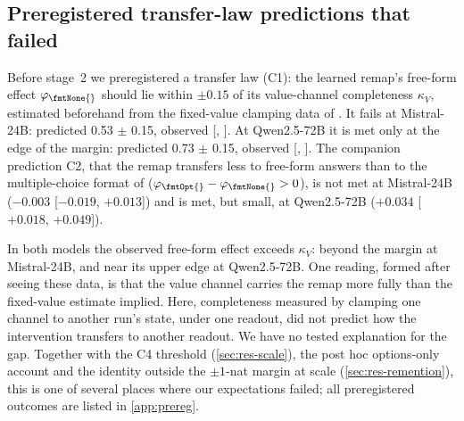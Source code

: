 \subsection{Preregistered transfer-law predictions that failed}\label{sec:res-failed}

Before stage~2 we preregistered a transfer law (C1): the learned remap's free-form effect $\varphi_{\fmtNone{}}$ should lie within $\pm 0.15$ of its value-channel completeness $\kappa_V$, estimated beforehand from the fixed-value clamping data of \citet{anonymous2026fitted}. It fails at Mistral-24B: predicted 0.53 $\pm$ 0.15, observed \phiNoneMistral{} [\phiLoNoneMistral{}, \phiHiNoneMistral{}]. At Qwen2.5-72B it is met only at the edge of the margin: predicted 0.73 $\pm$ 0.15, observed \phiNoneQwen{} [\phiLoNoneQwen{}, \phiHiNoneQwen{}]. The companion prediction C2, that the remap transfers less to free-form answers than to the multiple-choice format of \citet{anonymous2026fitted} ($\varphi_{\fmtOpt{}} - \varphi_{\fmtNone{}} > 0$), is not met at Mistral-24B ($-0.003$ [$-0.019$, $+0.013$]) and is met, but small, at Qwen2.5-72B ($+0.034$ [$+0.018$, $+0.049$]).

In both models the observed free-form effect exceeds $\kappa_V$: beyond the margin at Mistral-24B, and near its upper edge at Qwen2.5-72B. One reading, formed after seeing these data, is that the value channel carries the remap more fully than the fixed-value estimate implied. Here, completeness measured by clamping one channel to another run's state, under one readout, did not predict how the intervention transfers to another readout. We have no tested explanation for the gap. Together with the C4 threshold (\cref{sec:res-scale}), the post hoc options-only account and the \fmtNone{} identity outside the $\pm 1$-nat margin at scale (\cref{sec:res-remention}), this is one of several places where our expectations failed; all preregistered outcomes are listed in \cref{app:prereg}.
